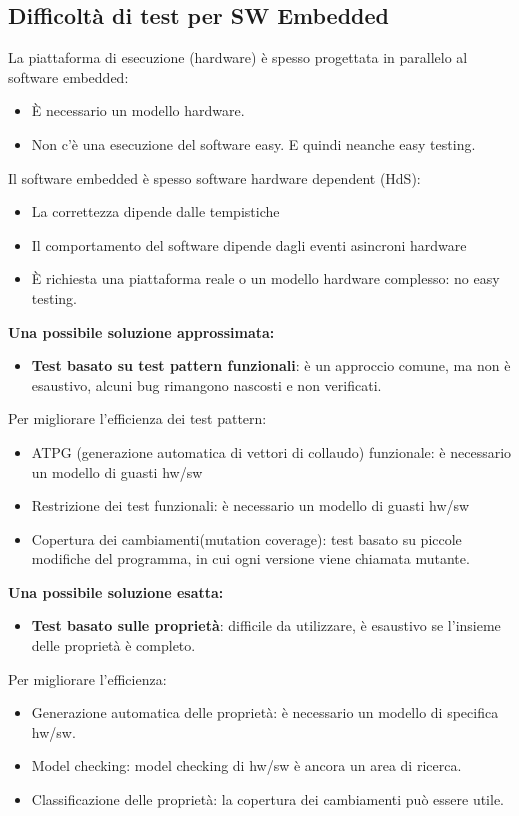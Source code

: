 \documentclass[a4paper]{article}
\theoremstyle{definition}
\begin{document}
		\subsection{Difficoltà di test per SW Embedded}
			La piattaforma di esecuzione (hardware) è spesso progettata in parallelo al software embedded:
			\begin{itemize}
				\item È necessario un modello hardware.
				\item Non c'è una esecuzione del software easy. E quindi neanche easy testing.
			\end{itemize}
			Il software embedded è spesso software hardware dependent (HdS):
			\begin{itemize}
				\item La correttezza dipende dalle tempistiche
				\item Il comportamento del software dipende dagli eventi asincroni hardware
				\item È richiesta una piattaforma reale o un modello hardware complesso: no easy testing.
			\end{itemize}
			
			\noindent
			\textbf{Una possibile soluzione approssimata:}
			\begin{itemize}
				\item \textbf{Test basato su test pattern funzionali}: è un approccio comune, ma non è esaustivo, alcuni bug rimangono nascosti e non verificati.
			\end{itemize}
			Per migliorare l'efficienza dei test pattern:
			\begin{itemize}
				\item ATPG (generazione automatica di vettori di collaudo) funzionale: è necessario un modello di guasti hw/sw
				\item Restrizione dei test funzionali: è necessario un modello di guasti hw/sw
				\item Copertura dei cambiamenti(mutation coverage): test basato su piccole modifiche del programma, in cui ogni versione viene chiamata mutante.
			\end{itemize}
			
			\noindent
			\textbf{Una possibile soluzione esatta:}
			\begin{itemize}
				\item \textbf{Test basato sulle proprietà}: difficile da utilizzare, è esaustivo se l'insieme delle proprietà è completo.
			\end{itemize}
			Per migliorare l'efficienza:
			\begin{itemize}
				\item Generazione automatica delle proprietà: è necessario un modello di specifica hw/sw.
				\item Model checking: model checking di hw/sw è ancora un area di ricerca.
				\item Classificazione delle proprietà: la copertura dei cambiamenti può essere utile.
			\end{itemize}
			
\end{document}
